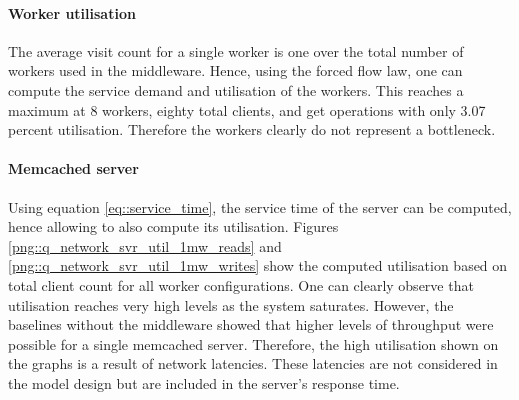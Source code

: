 \documentclass[11pt,a4paper]{article}
\begin{document}
\paragraph{Worker utilisation}
The average visit count for a single worker is one over the total number of workers used in the middleware. Hence, using the forced flow law, one can compute the service demand and utilisation of the workers. This reaches a maximum at 8 workers, eighty total clients, and get operations with only 3.07 percent utilisation. Therefore the workers clearly do not represent a bottleneck.

\paragraph{Memcached server}
Using equation \ref{eq::service_time}, the service time of the server can be computed, hence allowing to also compute its utilisation. Figures \ref{png::q_network_svr_util_1mw_reads} and \ref{png::q_network_svr_util_1mw_writes} show the computed utilisation based on total client count for all worker configurations. One can clearly observe that utilisation reaches very high levels as the system saturates. However, the baselines without the middleware showed that higher levels of throughput were possible for a single memcached server. Therefore, the high utilisation shown on the graphs is a result of network latencies. These latencies are not considered in the model design but are included in the server's response time.
\end{document}

